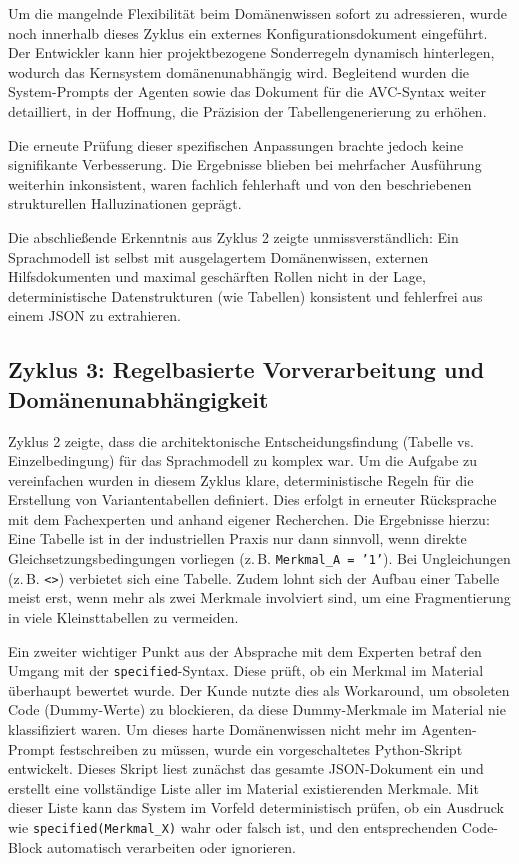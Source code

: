 Um die mangelnde Flexibilität beim Domänenwissen sofort zu adressieren, wurde noch innerhalb dieses Zyklus ein externes Konfigurationsdokument eingeführt. Der Entwickler kann hier projektbezogene Sonderregeln dynamisch hinterlegen, wodurch das Kernsystem domänenunabhängig wird. Begleitend wurden die System-Prompts der Agenten sowie das Dokument für die \ac{AVC}-Syntax weiter detailliert, in der Hoffnung, die Präzision der Tabellengenerierung zu erhöhen.

Die erneute Prüfung dieser spezifischen Anpassungen brachte jedoch keine signifikante Verbesserung. Die Ergebnisse blieben bei mehrfacher Ausführung weiterhin inkonsistent, waren fachlich fehlerhaft und von den beschriebenen strukturellen Halluzinationen geprägt. 

Die abschließende Erkenntnis aus Zyklus 2 zeigte unmissverständlich: Ein Sprachmodell ist selbst mit ausgelagertem Domänenwissen, externen Hilfsdokumenten und maximal geschärften Rollen nicht in der Lage, deterministische Datenstrukturen (wie Tabellen) konsistent und fehlerfrei aus einem JSON zu extrahieren.

\subsection{Zyklus 3: Regelbasierte Vorverarbeitung und Domänenunabhängigkeit}
\label{subsec:zyklus_3_regelbasiert}

Zyklus 2 zeigte, dass die architektonische Entscheidungsfindung (Tabelle vs. Einzelbedingung) für das Sprachmodell zu komplex war. Um die Aufgabe zu vereinfachen wurden in diesem Zyklus klare, deterministische Regeln für die Erstellung von Variantentabellen definiert. Dies erfolgt in erneuter Rücksprache mit dem Fachexperten und anhand eigener Recherchen. Die Ergebnisse hierzu: Eine Tabelle ist in der industriellen Praxis nur dann sinnvoll, wenn direkte Gleichsetzungsbedingungen vorliegen (z.\,B. \texttt{Merkmal\_A = '1'}). Bei Ungleichungen (z.\,B. \texttt{<>}) verbietet sich eine Tabelle. Zudem lohnt sich der Aufbau einer Tabelle meist erst, wenn mehr als zwei Merkmale involviert sind, um eine Fragmentierung in viele Kleinsttabellen zu vermeiden.

Ein zweiter wichtiger Punkt aus der Absprache mit dem Experten betraf den Umgang mit der \texttt{specified}-Syntax. Diese prüft, ob ein Merkmal im Material überhaupt bewertet wurde. Der Kunde nutzte dies als Workaround, um obsoleten Code (Dummy-Werte) zu blockieren, da diese Dummy-Merkmale im Material nie klassifiziert waren. Um dieses harte Domänenwissen nicht mehr im Agenten-Prompt festschreiben zu müssen, wurde ein vorgeschaltetes Python-Skript entwickelt. Dieses Skript liest zunächst das gesamte JSON-Dokument ein und erstellt eine vollständige Liste aller im Material existierenden Merkmale. Mit dieser Liste kann das System im Vorfeld deterministisch prüfen, ob ein Ausdruck wie \texttt{specified(Merkmal\_X)} wahr oder falsch ist, und den entsprechenden Code-Block automatisch verarbeiten oder ignorieren. 

